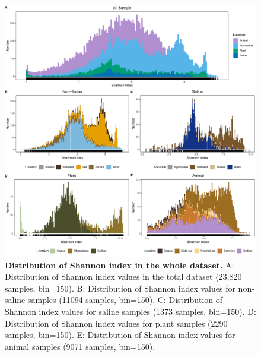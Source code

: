 \begin{figure}[H]
    \centering
    \includegraphics[scale=0.33]{./Figures/Shan_hist_empo2}
    \caption{\textbf{Distribution of Shannon index in the whole dataset.} A: Distribution of Shannon index values in the total dataset (23,820 samples, bin=150). B: Distribution of Shannon index values for non-saline samples (11094 samples, bin=150). C: Distribution of Shannon index values for saline samples (1373 samples, bin=150). D: Distribution of Shannon index values for plant samples (2290 samples, bin=150). E: Distribution of Shannon index values for animal samples (9071 samples, bin=150).}
    \label{fig:Shan_hist}
\end{figure}

